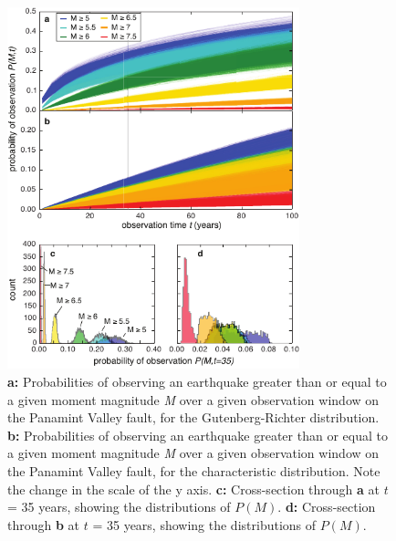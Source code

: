 \documentclass[draft,grl]{AGUTeX}
\begin{document}
\begin{figure}
\noindent\includegraphics[width=20pc]{./figures/pv_probs.pdf}
\caption{\textbf{a:} Probabilities of observing an earthquake greater than
or equal to a given moment magnitude \emph{M} over a given observation
window on the Panamint Valley fault, for the Gutenberg-Richter
distribution.  \textbf{b:} Probabilities of observing an earthquake greater
than or equal to a given moment magnitude \emph{M} over a given observation
window on the Panamint Valley fault, for the characteristic distribution.
Note the change in the scale of the y axis.  \textbf{c:} Cross-section
through \textbf{a} at $t$ = 35 years, showing the distributions of $P(M)$.
\textbf{d:} Cross-section through \textbf{b} at $t$ = 35 years, showing the
distributions of $P(M)$.} 
\label{fig:pv} 
\end{figure}
\end{document}
